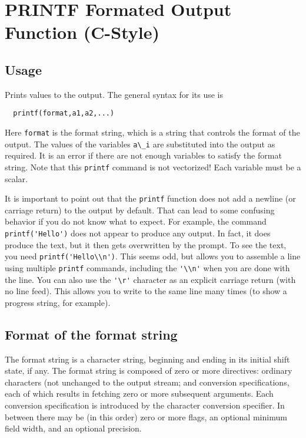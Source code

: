 \section{PRINTF Formated Output Function (C-Style)}

\subsection{Usage}

Prints values to the output.  The general syntax for its use is
\begin{verbatim}
  printf(format,a1,a2,...)
\end{verbatim}
Here \verb|format| is the format string, which is a string that
controls the format of the output.  The values of the variables
\verb|a\_i| are substituted into the output as required.  It is
an error if there are not enough variables to satisfy the format
string.  Note that this \verb|printf| command is not vectorized!  Each
variable must be a scalar.

It is important to point out that the \verb|printf| function does not
add a newline (or carriage return) to the output by default.  That
can lead to some confusing behavior if you do not know what to expect.
For example, the command \verb|printf('Hello')| does not appear to
produce any output.  In fact, it does produce the text, but it then
gets overwritten by the prompt.  To see the text, you need 
\verb|printf('Hello\\n')|.  This seems odd, but allows you to assemble a
line using multiple \verb|printf| commands, including the \verb|'\\n'| when
you are done with the line.  You can also use the \verb|'\r'| character
as an explicit carriage return (with no line feed).  This allows you
to write to the same line many times (to show a progress string, for
example).

\subsection{Format of the format string}


The  format  string  is a character string, beginning and ending in its
initial shift state, if any.  The format string is composed of zero  or
more   directives:  ordinary  characters  (not  %
unchanged to the output stream; and conversion specifications, each  of
which results in fetching zero or more subsequent arguments.  Each 
conversion specification is introduced by the character %
conversion  specifier.  In between there may be (in this order) zero or
more flags, an optional minimum field width, and an optional precision.

